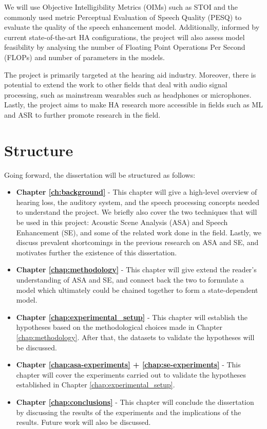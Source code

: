 \documentclass[logo,bsc,singlespacing,parskip,online]{infthesis}
\begin{document}
We will use Objective Intelligibility Metrics (OIMs) such as STOI 
and the commonly used metric Perceptual Evaluation of Speech Quality (PESQ)  
to evaluate the quality of the speech enhancement model.
Additionally, informed by current state-of-the-art HA configurations, the project will also assess model feasibility by analysing the number of Floating Point Operations Per Second (FLOPs) and number of parameters
in the models.

The project is primarily targeted at the hearing aid industry. 
Moreover, there is potential to extend the work to other fields that deal with audio signal processing,
such as mainstream wearables such as headphones or microphones. Lastly, the project aims to make HA research more accessible in fields such as ML and ASR to further promote research in the field.


\section{Structure}
Going forward, the dissertation will be structured as follows:
\begin{itemize}  
   \item \textbf{Chapter \ref{ch:background}} - This chapter will give a high-level overview of hearing loss, the auditory system, and the speech processing concepts needed to understand the project.
   We briefly also cover the two techniques that will be used in this project: Acoustic Scene Analysis (ASA) and Speech Enhancement (SE),
   and some of the related work done in the field. Lastly, we discuss prevalent shortcomings in the previous 
   research on ASA and SE, and motivates further the existence of this dissertation.
   \item \textbf{Chapter \ref{chap:methodology}} - This chapter will give extend the reader's
   understanding of ASA and SE, and connect back the two to formulate a model
   which ultimately could be chained together to form a state-dependent model.
   \item \textbf{Chapter \ref{chap:experimental_setup}} - This chapter will establish the hypotheses based on the methodological choices made in Chapter \ref{chap:methodology}. After that, the datasets to 
   validate the hypotheses will be discussed.
   \item \textbf{Chapter \ref{chap:asa-experiments} + \ref{chap:se-experiments}} - This chapter will cover the experiments carried out to validate the hypotheses established in Chapter \ref{chap:experimental_setup}.
   \item \textbf{Chapter \ref{chap:conclusions}} - This chapter will conclude the dissertation by discussing the results of the experiments and the implications of the results. Future work will also be discussed.
\end{itemize}
 
\end{document}
